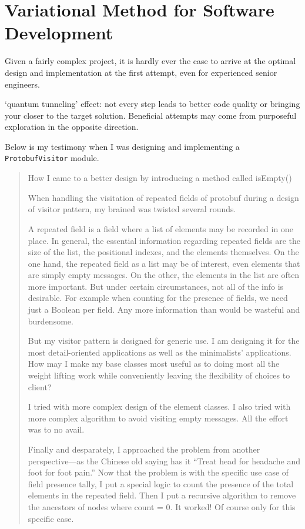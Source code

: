 \documentclass[oneside,11pt]{book}
\theoremstyle{definition}
\theoremstyle{remark}
\newcommand{\code}[1]{\mbox{\lstinline{#1}}}
\begin{document}
\chapter{Variational Method for Software Development} \label{ch:variational}
Given a fairly complex project, it is hardly ever the case to arrive at the optimal design and
implementation at the first attempt, even for experienced senior engineers.

`quantum tunneling' effect: not every step leads to better code quality or bringing your closer
to the target solution.
Beneficial attempts may come from purposeful exploration in the opposite direction.

Below is my testimony when I was designing and implementing a \code{ProtobufVisitor} module.
\begin{quotation}
    How I came to a better design by introducing a method called isEmpty()

    When handling the visitation of repeated fields of protobuf during a design of visitor pattern,
    my brained was twisted several rounds.

    A repeated field is a field where a list of elements may be recorded in one place.
    In general, the essential information regarding repeated fields are the size of the list, the
    positional indexes, and the elements themselves.
    On the one hand, the repeated field as a list may be of interest, even elements that
    are simply empty messages.
    On the other, the elements in the list are often more important.
    But under certain circumstances, not all of the info is desirable.
    For example when counting for the presence of fields, we need just a Boolean per field.
    Any more information than would be wasteful and burdensome.

    But my visitor pattern is designed for generic use.
    I am designing it for the most detail-oriented applications as well as the minimalists'
    applications.
    How may I make my base classes most useful as to doing most all the weight lifting work while
    conveniently leaving the flexibility of choices to client?

    I tried with more complex design of the element classes.
    I also tried with more complex algorithm to
    avoid visiting empty messages.
    All the effort was to no avail.

    Finally and desparately, I approached the problem from another perspective---as the Chinese
    old saying has it ``Treat head for headache and foot for foot pain.''
    Now that the problem is with the specific use case of field presence tally,
    I put a special logic to count the
    presence of the total elements in the repeated field.
    Then I put a recursive algorithm to remove
    the ancestors of nodes where count = 0.
    It worked!
    Of course only for this specific case.


\end{quotation}
\end{document}
